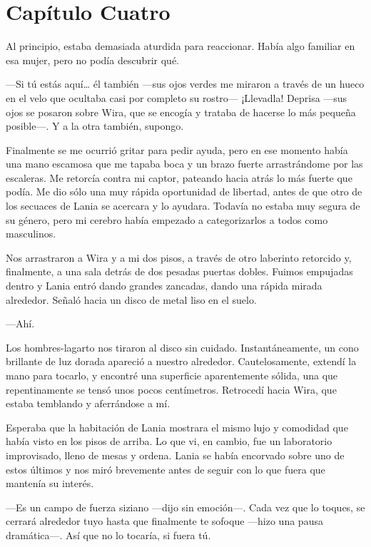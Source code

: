 \chapter*{Capítulo Cuatro}

Al principio, estaba demasiada aturdida para reaccionar. Había algo
familiar en esa mujer, pero no podía descubrir qué.

---Si tú estás aquí\ldots{} él también ---sus ojos verdes me miraron a
través de un hueco en el velo que ocultaba casi por completo su
rostro--- ¡Llevadla! Deprisa ---sus ojos se posaron sobre Wira, que se
encogía y trataba de hacerse lo más pequeña posible---. Y a la otra
también, supongo.

Finalmente se me ocurrió gritar para pedir ayuda, pero en ese momento
había una mano escamosa que me tapaba boca y un brazo fuerte
arrastrándome por las escaleras. Me retorcía contra mi captor, pateando
hacia atrás lo más fuerte que podía. Me dio sólo una muy rápida
oportunidad de libertad, antes de que otro de los secuaces de Lania se
acercara y lo ayudara. Todavía no estaba muy segura de su género, pero
mi cerebro había empezado a categorizarlos a todos como masculinos.

Nos arrastraron a Wira y a mi dos pisos, a través de otro laberinto
retorcido y, finalmente, a una sala detrás de dos pesadas puertas
dobles. Fuimos empujadas dentro y Lania entró dando grandes zancadas,
dando una rápida mirada alrededor. Señaló hacia un disco de metal liso
en el suelo.

---Ahí.

Los hombres-lagarto nos tiraron al disco sin cuidado. Instantáneamente,
un cono brillante de luz dorada apareció a nuestro alrededor.
Cautelosamente, extendí la mano para tocarlo, y encontré una superficie
aparentemente sólida, una que repentinamente se tensó unos pocos
centímetros. Retrocedí hacia Wira, que estaba temblando y aferrándose a
mí.

Esperaba que la habitación de Lania mostrara el mismo lujo y comodidad
que había visto en los pisos de arriba. Lo que vi, en cambio, fue un
laboratorio improvisado, lleno de mesas y ordena. Lania se había
encorvado sobre uno de estos últimos y nos miró brevemente antes de
seguir con lo que fuera que mantenía su interés.

---Es un campo de fuerza siziano ---dijo sin emoción---. Cada vez que lo
toques, se cerrará alrededor tuyo hasta que finalmente te sofoque
---hizo una pausa dramática---. Así que no lo tocaría, si fuera tú.

